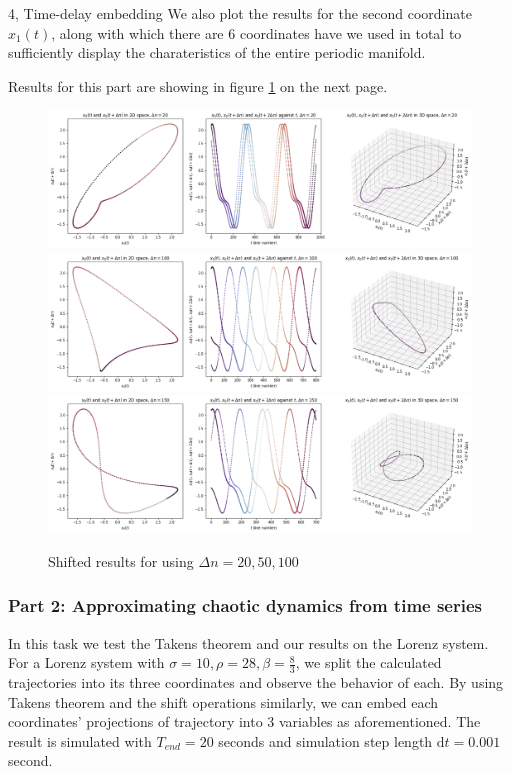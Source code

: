 \documentclass[10pt,a4paper]{article}
\begin{document}
\begin{task}{4, Time-delay embedding}
We also plot the results for the second coordinate $x_1(t)$, along with which there are 6 coordinates have we used in total to sufficiently display the charateristics of the entire periodic manifold. 

Results for this part are showing in figure \ref{task4-1-1} on the next page.

\begin{figure}[H]
    \centering
    \includegraphics[width=16cm]{images/task4-1-1-20.png}
    \includegraphics[width=16cm]{images/task4-1-1-100.png}
    \includegraphics[width=16cm]{images/task4-1-1-150.png}
    \caption{Shifted results for using $\Delta n=20, 50, 100$} 
    \label{task4-1-1}
\end{figure}

\bigskip

\subsubsection*{Part 2: Approximating chaotic dynamics from time series}

In this task we test the Takens theorem and our results on the Lorenz system. For a Lorenz system with $\sigma=10, \rho=28, \beta=\frac{8}{3}$, we split the calculated trajectories into its three coordinates and observe the behavior of each. By using Takens theorem and the shift operations similarly, we can embed each coordinates' projections of trajectory into 3 variables as aforementioned. The result is simulated with $T_{end}=20$ seconds and simulation step length $\text{d}t=0.001$ second.


\end{task}
\end{document}
